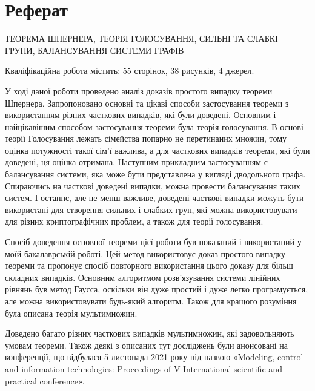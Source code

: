\chapter*{Реферат}

\MakeUppercase{Теорема Шпернера, теорія голосування, сильні та слабкі групи, балансування системи графів}

Кваліфікаційна робота містить: 55 сторінок, 38 рисунків, 4 джерел.

У ході даної роботи проведено аналіз доказів простого випадку теореми Шпернера. Запропоновано основні та цікаві способи застосування теореми з використанням різних часткових випадків, які були доведені. Основним і найцікавішим способом застосування теореми була теорія голосування. В основі теорії Голосування лежать сімейства попарно не перетинаних множин, тому оцінка потужності такої сім'ї важлива, а для часткових випадків теореми, які були доведені, ця оцінка отримана. Наступним прикладним застосуванням є балансування системи, яка може бути представлена ​​у вигляді дводольного графа. Спираючись на часткові доведені випадки, можна провести балансування таких систем. І останнє, але не менш важливе, доведені часткові випадки можуть бути використані для створення сильних і слабких груп, які можна використовувати для різних криптографічних проблем, а також для теорії голосування.

Спосіб доведення основної теореми цієї роботи був показаний і використаний у моїй бакалаврській роботі. Цей метод використовує доказ простого випадку теореми та пропонує спосіб повторного використання цього доказу для більш складних випадків. Основним алгоритмом розв’язування системи лінійних рівнянь був метод Гаусса, оскільки він дуже простий і дуже легко програмується, але можна використовувати будь-який алгоритм. Також для кращого розуміння була описана теорія мультимножин.

Доведено багато різних часткових випадків мультимножин, які задовольняють умовам теореми. Також деякі з описаних тут досліджень були анонсовані на конференції, що відбулася 5 листопада 2021 року під назвою «Modeling, control and information technologies: Proceedings of V International scientific and practical conference».